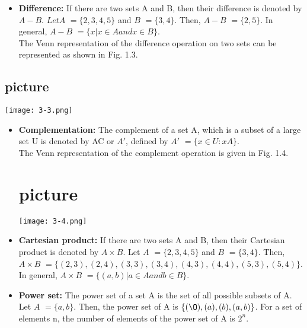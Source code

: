 \documentclass[10pt]{article}
\begin{document}
\begin{itemize}
  \item \textbf{Difference:} If there are two sets A and B, then their difference is denoted by $A - B$. $Let A$ $= \{2, 3, 4, 5\}$ and $B$ $= \{3, 4\}$. Then, $A - B$ $= \{2, 5\}$. In general, $A - B$ $= \{x | x \in A and x \in B\}$.\\
   \hspace*{0.2cm} The Venn representation of the difference operation on two sets can be represented as shown in Fig. 1.3.

\end{itemize}

\begin{center}
\section{picture}
\texttt{[image: 3-3.png]}
\end{center}

\begin{itemize}
  \item \textbf{Complementation:} The complement of a set A, which is a subset of a large set U is denoted by AC or $A'$, defined by $A'$ $= \{x \in U: x A\}$.\\
\hspace*{0.2cm} The Venn representation of the complement operation is given in Fig. 1.4.

\begin{center}
\section{picture}
\texttt{[image: 3-4.png]}
\end{center}
\end{itemize}

\begin{itemize}
  \item \textbf{Cartesian product:} If there are two sets A and B, then their Cartesian
product is denoted by $A \times B$. Let $A$ $= \{2, 3, 4, 5\}$ and $B$ $= \{3, 4\}$. Then,
$A \times B$ $= \{(2, 3), (2, 4), (3, 3), (3, 4),(4, 3), (4, 4), (5, 3), (5, 4)\}$. In general,
$A \times B$ $= \{(a, b)| a \in A and b \in B\}$.
  \item \textbf{Power set:} The power set of a set A is the set of all possible subsets of A.
Let $A$ $= \{a, b\}$. Then, the power set of A is $\{({\O}), (a), (b), (a, b)\}$. For a set
of elements n, the number of elements of the power set of A is $2^n$.
\end{itemize}
\end{document}
